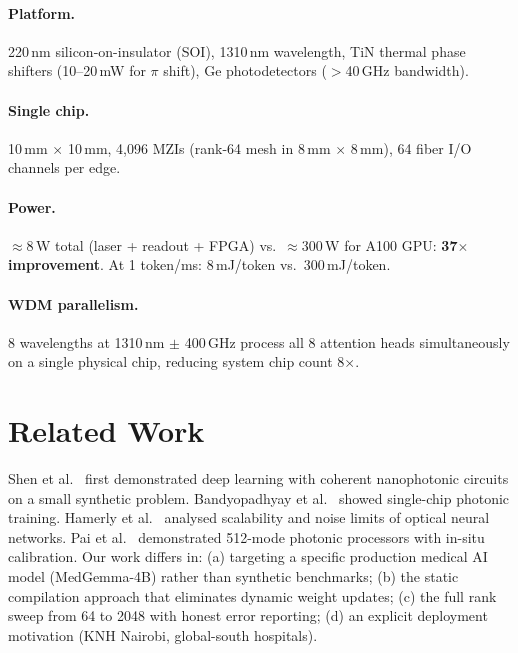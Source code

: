 \documentclass{article}
\begin{document}
\paragraph{Platform.} 220\,nm silicon-on-insulator (SOI), 1310\,nm wavelength,
TiN thermal phase shifters (10--20\,mW for $\pi$ shift), Ge photodetectors
($>$40\,GHz bandwidth).

\paragraph{Single chip.} 10\,mm $\times$ 10\,mm, 4,096 MZIs (rank-64 mesh in
8\,mm $\times$ 8\,mm), 64 fiber I/O channels per edge.

\paragraph{Power.}
$\approx 8$\,W total (laser + readout + FPGA) vs.\ $\approx 300$\,W for A100
GPU: \textbf{37$\times$ improvement}.
At 1 token/ms: 8\,mJ/token vs.\ 300\,mJ/token.

\paragraph{WDM parallelism.}
8 wavelengths at 1310\,nm $\pm$ 400\,GHz process all 8 attention heads
simultaneously on a single physical chip, reducing system chip count 8$\times$.

\section{Related Work}

Shen et al.~\citep{shen2017} first demonstrated deep learning with coherent
nanophotonic circuits on a small synthetic problem.
Bandyopadhyay et al.~\citep{bandyopadhyay2022} showed single-chip photonic
training.
Hamerly et al.~\citep{hamerly2019} analysed scalability and noise limits of
optical neural networks.
Pai et al.~\citep{pai2023} demonstrated 512-mode photonic processors with in-situ
calibration.
Our work differs in: (a) targeting a specific production medical AI model
(MedGemma-4B) rather than synthetic benchmarks; (b) the static compilation
approach that eliminates dynamic weight updates; (c) the full rank sweep from
64 to 2048 with honest error reporting; (d) an explicit deployment motivation
(KNH Nairobi, global-south hospitals).

\end{document}
